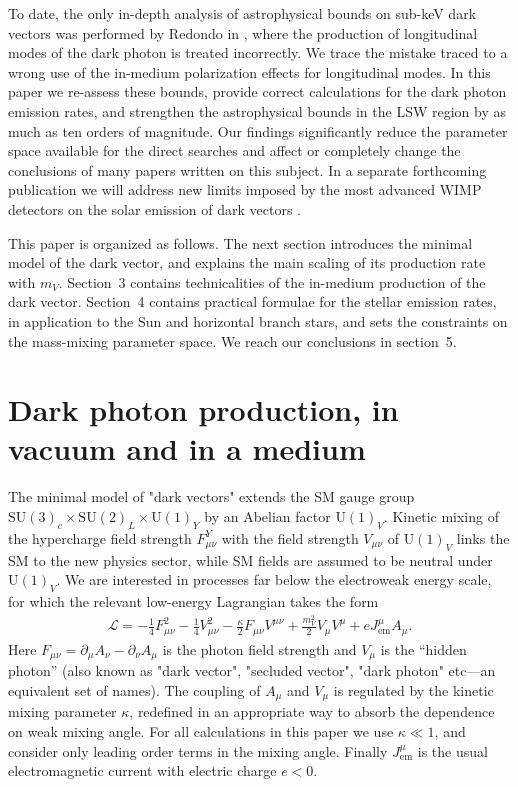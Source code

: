 \documentclass[12pt]{article}
\newcommand{\SMgroup}{\ensuremath {\mathrm{SU}}(3)_{c}\times {\mathrm{SU}}(2)_{L}\times{\mathrm U}(1)_{Y}}
\newcommand{\Uoneprime}{\ensuremath {\mathrm U}(1)_{V}}
\begin{document}
To date, the only in-depth analysis of astrophysical bounds on sub-keV
dark vectors was performed by Redondo in \cite{Redondo:2008aa}, where the production of longitudinal modes of the dark photon is treated incorrectly. We trace the mistake traced to a
wrong use of the in-medium polarization effects for longitudinal modes.   In
this paper we re-assess these bounds, provide correct calculations for
the dark photon emission rates, and strengthen the astrophysical
bounds in the LSW region by as much as ten orders of magnitude. Our
findings significantly reduce the parameter space available for the
direct searches and affect or completely change the conclusions of
many papers written on this subject. In a separate forthcoming
publication we will address new limits imposed by the most advanced
WIMP detectors on the solar emission of dark vectors
\cite{ournextpaper}.

This paper is organized as follows. The next section introduces the
minimal model of the dark vector, and explains the main scaling of its
production rate with $m_V$. Section~3 contains technicalities of the
in-medium production of the dark vector. Section~4 contains practical
formulae for the stellar emission rates, in application to the Sun and
horizontal branch stars, and sets the constraints on the mass-mixing parameter
space.  We reach our conclusions in section~5.





\section{Dark photon production, in vacuum and in a medium}
\label{sec:2}



The minimal model of "dark vectors" extends the SM gauge group $\SMgroup$ by an
Abelian factor $\Uoneprime$. Kinetic mixing of the hypercharge field
strength $F_{\mu\nu}^Y$ with the field strength $V_{\mu\nu}$ of
$\Uoneprime$ links the SM to the new physics sector, while SM fields are
assumed to be neutral under $\Uoneprime$. We are interested in processes
far below the electroweak energy scale, for which the relevant
low-energy Lagrangian takes the form
%
\begin{align}
  \label{eq:L}
  \mathcal{L} = -\frac{1}{4} F_{\mu\nu}^2-\frac{1}{4} V_{\mu\nu}^2 -
  \frac{\kappa}{2} F_{\mu\nu}V^{\mu\nu} + \frac{m_V^2}{2} V_{\mu}V^{\mu}
  + e J_{\mathrm{em}}^{\mu} A_{\mu} .
\end{align}
%
Here $F_{\mu\nu} = \partial_{\mu} A_{\nu} -\partial_{\nu} A_{\mu} $ is
the photon field strength and $V_{\mu}$ is the ``hidden photon'' (also
known as "dark vector", "secluded vector", "dark photon" etc---an
equivalent set of names). The coupling of $A_\mu$ and $V_\mu$ is
regulated by the kinetic mixing parameter $\kappa$, redefined in an
appropriate way to absorb the dependence on weak mixing angle. For all
calculations in this paper we use $\kappa\ll 1$, and consider only
leading order terms in the mixing angle.  Finally $
J_{\mathrm{em}}^{\mu}$ is the usual electromagnetic current with
electric charge $e<0$.
\end{document}
